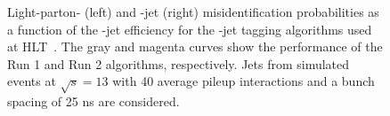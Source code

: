 \begin{figure}
\centering
{}
\caption{
Light-parton- (left) and \cPqc-jet (right) misidentification
probabilities as a function of the \cPqb-jet efficiency for the
\cPqb-jet tagging algorithms used at HLT~\cite{Tosi:2015zhy}. The gray and
magenta curves show the performance of the Run 1 and Run 2 algorithms,
respectively. 
Jets from simulated \ttbar events at $\sqrt{s} = 13$ \TeV with 40
average pileup interactions and a bunch spacing of 25 \unit{ns} are considered. 
\label{fig:mcPerformance2015}}
\end{figure}


%
% 
%
%


